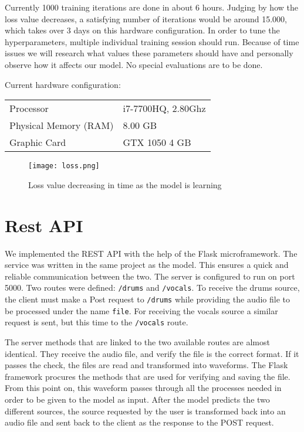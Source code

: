 \documentclass[../Thesis.tex]{subfiles}
\begin{document}
Currently 1000 training iterations are done in about 6 hours. Judging by how the loss value decreases, a satisfying number of iterations would be around 15.000, which takes over 3 days on this hardware configuration. In order to tune the hyperparameters, multiple individual training session should run. Because of time issues we will research what values these parameters should have and personally observe how it affects our model. No special evaluations are to be done.

\smallskip
Current hardware configuration:

\begin{tabular}{ll}
Processor & i7-7700HQ, \@ 2.80Ghz \\
Physical Memory (RAM) & 8.00 GB  \\
Graphic Card & GTX 1050 4 GB
\end{tabular}

\clearpage

\begin{figure}[h]
\centering
\label {fig: loss}
\texttt{[image: loss.png]}
\caption[width=0.5\textwidth]{Loss value decreasing in time as the model is learning}
\end{figure}

\section {Rest API}

We implemented the REST API with the help of the Flask microframework. The service was written in the same project as the model. This ensures a quick and reliable communication between the two. 
The server is configured to run on port 5000. Two routes were defined: \texttt{/drums} and \texttt{/vocals}. To receive the drums source, the client must make a Post request to \texttt{/drums} while providing the audio file to be processed under the name \texttt{file}. For receiving the vocals source a similar request is sent, but this time to the \texttt{/vocals} route.

 The server methods that are linked to the two available routes are almost identical. They receive the audio file, and verify the file is the correct format. If it passes the check, the files are read and transformed into waveforms. The Flask framework procures the methods that are used for verifying and saving the file.  From this point on, this waveform passes through all the processes needed in order to be given to the model as input. After the model predicts the two different sources, the source requested by the user is transformed back into an audio file and sent back to the client as the response to the POST request.
\end{document}
